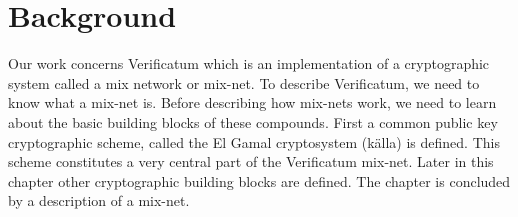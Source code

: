 \section{Background}

Our work concerns Verificatum which is an implementation of a
cryptographic system called a mix network or mix-net. To describe
Verificatum, we need to know what a mix-net is. Before describing how
mix-nets work, we need to learn about the basic building blocks of
these compounds. First a common public key cryptographic scheme,
called the El Gamal cryptosystem (källa) is defined. This scheme
constitutes a very central part of the Verificatum mix-net. Later in
this chapter other cryptographic building blocks are defined. The
chapter is concluded by a description of a mix-net.




